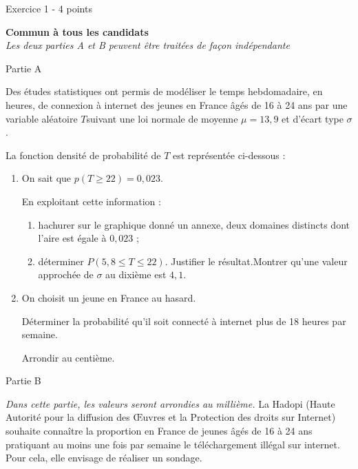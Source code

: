 
%
\begin{h2}Exercice 1 -  4 points\end{h2}

\textbf{Commun  à tous les candidats}
\\
\textit{Les deux parties A et B peuvent être traitées de façon indépendante}
\begin{h3}Partie A\end{h3}
Des études statistiques ont permis de modéliser le temps hebdomadaire, en heures, de connexion à internet des jeunes en France âgés de 16 à 24 ans par une variable aléatoire $T$suivant une loi normale de moyenne $\mu = 13,9$ et d'écart type $\sigma$.
\par
La fonction densité de probabilité de $T$ est représentée ci-dessous :
\begin{center}
\end{center}
\begin{enumerate}
     \item
     On sait que $p(T \geqslant 22) =  0,023$.
     \par
     En exploitant cette information :
     \begin{enumerate} [label=\alph*.]
          \item
          hachurer sur le graphique donné un annexe, deux domaines distincts dont l'aire est égale à $0,023$ ;
          \item
          déterminer $P(5,8 \leqslant T \leqslant 22)$. Justifier le résultat.Montrer qu'une valeur approchée de $\sigma$ au dixième est $4,1$.
     \end{enumerate}
     \item
     On choisit un jeune en France au hasard.
     \par
     Déterminer la probabilité qu'il soit connecté à internet plus de 18 heures par semaine.
     \par
     Arrondir au centième.
\end{enumerate}
\begin{h3}Partie B\end{h3}
\textit{Dans cette partie, les valeurs seront arrondies au millième.}
La Hadopi (Haute Autorité pour la diffusion des Œuvres et la Protection des droits sur Internet) souhaite connaître la proportion en France de jeunes âgés de 16 à 24 ans pratiquant au moins une fois par semaine le téléchargement illégal sur internet. Pour cela, elle envisage de réaliser un sondage.
